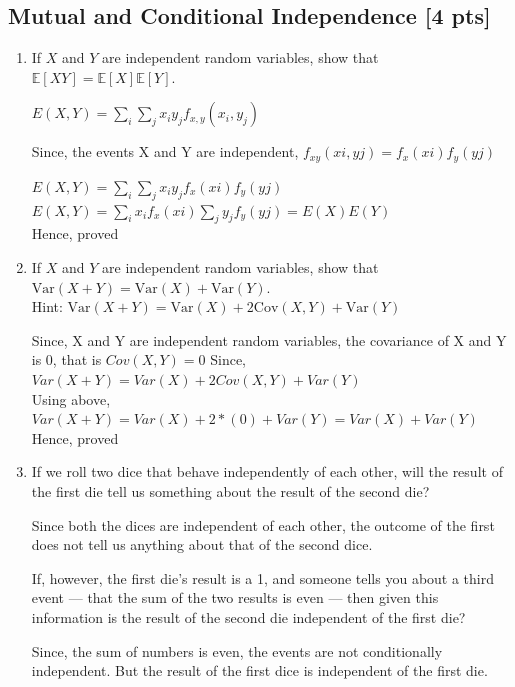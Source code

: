 \documentclass[a4paper]{article}
\theoremstyle{definition}
\newcommand{\Var}{\mathrm{Var}}
\newcommand{\Cov}{\mathrm{Cov}}
\newenvironment{soln}{
    \leavevmode\color{blue}\ignorespaces
}{}
\begin{document}
\subsection{Mutual and Conditional Independence [4 pts]}
\begin{enumerate}
\item If $X$ and $Y$ are independent random variables, show that
  $\mathbb{E}[XY] = \mathbb{E}[X]\mathbb{E}[Y]$.
  
  \begin{soln}  
	$E(X, Y) = \sum_{i} \sum_{j} x_{i} y_{j} f_{x,y} (x_{i}, y_{j})$
	
	Since, the events X and Y are independent, $ f_{xy} (xi, yj) = f_{x} (xi) f_{y} (yj) $
	
	$E(X, Y) = \sum_{i} \sum_{j} x_{i} y_{j} f_{x} (xi) f_{y} (yj)$
	\\$E(X, Y) = \sum_{i}  x_{i} f_{x} (xi) \sum_{j} y_{j} f_{y} (yj) = E(X)E(Y)$
	\\Hence, proved
 \end{soln}
  
\item If $X$ and $Y$ are independent random variables, show that
  $\Var(X+Y) = \Var(X) + \Var(Y)$. \\
  Hint: $\Var(X+Y) = \Var(X) + 2\Cov(X, Y) + \Var(Y)$
  
  \begin{soln}  
	Since, X and Y are independent random variables, the covariance of X and Y is 0, that is $Cov(X,Y) = 0$
	Since, $Var(X + Y ) = Var(X) + 2Cov(X, Y ) + Var(Y)$ 
	\\Using above,  $Var(X + Y ) = Var(X) + 2*(0) + Var(Y) = Var(X) + Var(Y)$
	\\Hence, proved
 \end{soln}
 
\item If we roll two dice that behave independently of each
  other, will the result of the first die tell us something about the
  result of the second die? 
  
  \begin{soln}  
		Since both the dices are independent of each other, the outcome of the first does not tell us anything about that of the second dice. 
		
 \end{soln}
  
  If, however, the first die's result is a 1,
  and someone tells you about a third event --- that the sum of the two
  results is even --- then given this information is the result of the second die
  independent of the first die? 
  
  \begin{soln}
 	Since, the sum of numbers is even, the events are not conditionally independent. But the result of the first dice is independent of the first die. 
	
 \end{soln}
\end{enumerate}
\end{document}
